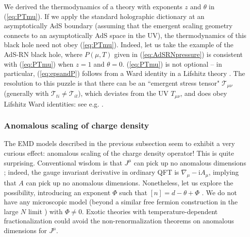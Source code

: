 \documentclass[10pt, oneside]{book}
\begin{document}
\begin{doublespace}
We derived the thermodynamics of a theory with exponents $z$ and $\theta$ in (\ref{eq:PTmu}).  If we apply the standard holographic dictionary at an asymptotically AdS boundary (assuming that the emergent scaling geometry connects to an asymptotically AdS space in the UV), the thermodynamics of this black hole need not obey (\ref{eq:PTmu}).   Indeed, let us take the example of the AdS-RN black hole, where $P(\mu,T)$ given in (\ref{eq:AdSRNpressure}) is consistent with (\ref{eq:PTmu}) when $z=1$ and $\theta=0$.   (\ref{eq:PTmu}) is not optional -- in particular, (\ref{eq:epsandP}) follows from a Ward identity in a Lifshitz theory \cite{Hoyos:2013qna}.    The resolution to this puzzle is that there can be an ``emergent stress tensor" $\mathcal{T}_{\mu\nu}$ (generally with $\mathcal{T}_{ti} \ne \mathcal{T}_{it}$), which deviates from the UV $T_{\mu\nu}$, and does obey Lifshitz Ward identities: see e.g. \cite{Korovin:2013bua}.


\subsubsection{Anomalous scaling of charge density}
\label{sec:anomalouscharge}

The EMD models described in the previous subsection seem to exhibit a very curious effect:  anomalous scaling of the charge density operator!   This is quite surprising.  Conventional wisdom is that $J^\mu$ can pick up no anomalous dimensions \cite{xgwen1992, subir1994}; indeed, the gauge invariant derivative in ordinary QFT is $\nabla_\mu - \mathrm{i}A_\mu$, implying that $A$ can pick up no anomalous dimensions.  Nonetheless, let us explore the possibility, introducing an exponent $\Phi$ such that $[n] = d-\theta+\Phi$ \cite{Hartnoll:2015sea}.   We do not have any microscopic model (beyond a similar free fermion construction in the large $N$ limit \cite{Karch:2015pha}) with $\Phi \ne 0$.   Exotic theories with temperature-dependent fractionalization \cite{Hartnoll:2015sea} could avoid the non-renormalization theorems on anomalous dimensions for $J^\mu$.   


\end{doublespace}
\end{document}
